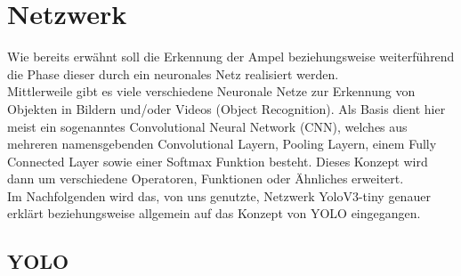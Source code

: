 \documentclass[a4paper,oneside,12pt]{report}
\begin{document}
	\chapter{Netzwerk}
	\begin{onehalfspace}
		Wie bereits erwähnt soll die Erkennung der Ampel beziehungsweise weiterführend die Phase dieser durch ein neuronales Netz realisiert werden.\\
		Mittlerweile gibt es viele verschiedene Neuronale Netze zur Erkennung von Objekten in Bildern und/oder Videos (Object Recognition). Als Basis dient hier meist ein sogenanntes Convolutional Neural Network (CNN), welches aus mehreren namensgebenden Convolutional Layern, Pooling Layern, einem Fully Connected Layer sowie einer Softmax Funktion besteht.
		Dieses Konzept wird dann um verschiedene Operatoren, Funktionen oder Ähnliches erweitert.\\
		Im Nachfolgenden wird das, von uns genutzte, Netzwerk YoloV3-tiny genauer erklärt beziehungsweise allgemein auf das Konzept von YOLO eingegangen.
		\section{YOLO}

\end{onehalfspace}
\end{document}
